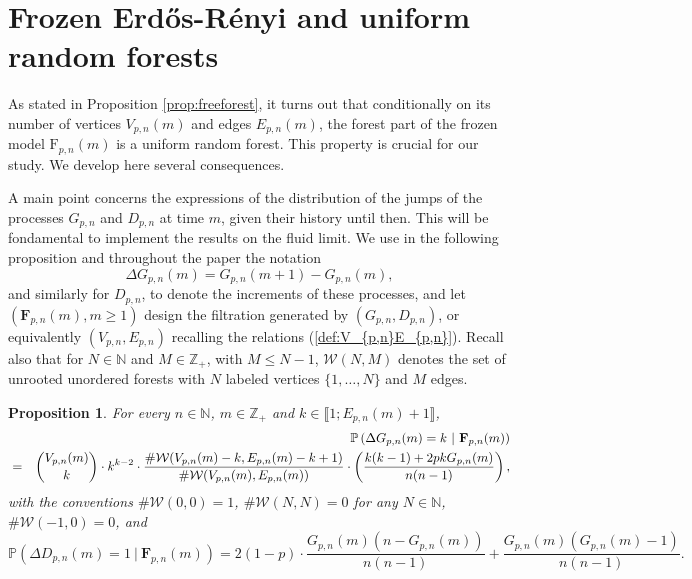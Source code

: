 \documentclass[a4, 11pt]{article}
\numberwithin{equation}{section}
\theoremstyle{plain}
\newtheorem{proposition}[theorem]{Proposition}
\theoremstyle{definition}
\theoremstyle{remark}
\begin{document}
\section{Frozen Erd\H{o}s-R\'enyi and uniform random forests}
\label{section:forests}

As stated in Proposition \ref{prop:freeforest}, it turns out that conditionally on its number of vertices $V_{p,n}(m)$ and edges $E_{p,n}(m)$, the forest part of the frozen model $\mathrm{F}_{p,n}(m)$ is a uniform random forest. This property is crucial for our study. We develop here several consequences.

A main point concerns the expressions of the distribution of the jumps of the processes $G_{p,n}$ and $D_{p,n}$ at time $m$, given their history until then. This will be fondamental to implement the results on the fluid limit.
We use in the following proposition and throughout the paper the notation $$ \Delta G_{p,n}(m)=G_{p,n}(m+1)-G_{p,n}(m),$$ and similarly for $D_{p,n}$, to denote the increments of these processes, and let $(\mathbf F_{p,n}(m),m\geq 1)$ design the filtration generated by $(G_{p,n},D_{p,n})$, or equivalently $(V_{p,n},E_{p,n})$ recalling the relations (\ref{def:V_{p,n}E_{p,n}}). Recall also that for $N \in \mathbb N$ and $M\in \mathbb Z_+$, with $M \leq N-1$, $\mathcal{W}(N,M)$ denotes the set of unrooted unordered forests with $N$ labeled vertices $\{1,\ldots,N\}$ and $M$ edges. 

\medskip

\begin{proposition}\label{lm_transitions}
	For every $n\in \mathbb N$, $m\in \mathbb Z_+$ and $k\in \llbracket 1; E_{p,n}(m)+1 \rrbracket$,
	\setlength{\jot}{10pt}
	\begin{eqnarray*}
      && \hspace{-1cm}\mathbb{P}\left( \Delta G_{p,n}(m)=k ~| ~ \mathbf{F}_{p,n}(m)\right) \\
	  & =&\binom{V_{p,n}(m)}{k} \cdot k^{k-2} \cdot \frac{\#\mathcal{W}(V_{p,n}(m)-k,E_{p,n}(m)-k+1)}{\#\mathcal{W}(V_{p,n}(m),E_{p,n}(m))} \cdot \left(\frac{k(k-1)+2pkG_{p,n}(m)}{n(n-1)}\right),
	\end{eqnarray*}
	with the conventions $\#\mathcal{W}(0,0)=1$, $\#\mathcal{W}(N,N)=0$ for any $N \in \mathbb N$, $\#\mathcal{W}(-1,0)=0$,
	and 
	$$\mathbb{P}\left(\Delta D_{p,n}(m)=1~| ~ \mathbf{F}_{p,n}(m)\right)=2(1-p) \cdot \frac{G_{p,n}(m)(n-G_{p,n}(m))}{n(n-1)}+\frac{G_{p,n}(m)(G_{p,n}(m)-1)}{n(n-1)}.$$
\end{proposition}
\end{document}
